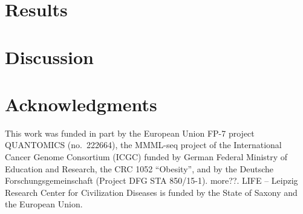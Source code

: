 \documentclass[preprint,3p,times,twocolumn]{elsarticle}
\newcommand{\TODO}[1] {\begingroup\color{red}#1\endgroup}
\begin{document}
\section{Results}


\section{Discussion}



\section*{Acknowledgments}

This work was funded in part by the European Union FP-7 project
QUANTOMICS (no.\ 222664), the MMML-seq project of the International
Cancer Genome Consortium (ICGC) funded by German Federal Ministry of
Education and Research, the CRC 1052 ``Obesity'', and by the Deutsche
Forschungsgemeinschaft (Project DFG STA 850/15-1). \TODO{more??}. LIFE
-- Leipzig Research Center for Civilization Diseases is funded by the
State of Saxony and the European Union.



\end{document}
